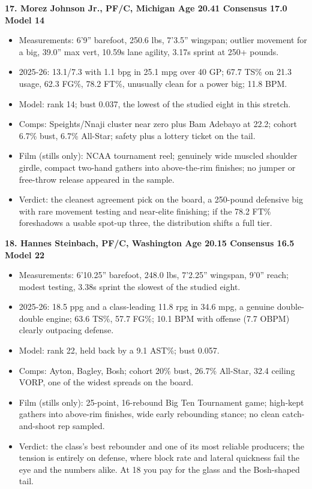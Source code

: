 \documentclass[
  10pt,
]{article}
\providecommand{\tightlist}{%
  \setlength{\itemsep}{0pt}\setlength{\parskip}{0pt}}
\begin{document}
\textbf{17. Morez Johnson Jr., PF/C, Michigan \textbar{} Age 20.41 \textbar{}
Consensus 17.0 \textbar{} Model 14}

\begin{itemize}
\tightlist
\item
  Measurements: 6'9'' barefoot, 250.6 lbs, 7'3.5'' wingspan; outlier movement
  for a big, 39.0'' max vert, 10.59s lane agility, 3.17s sprint at 250+ pounds.
\item
  2025-26: 13.1/7.3 with 1.1 bpg in 25.1 mpg over 40 GP; 67.7 TS\% on 21.3
  usage, 62.3 FG\%, 78.2 FT\%, unusually clean for a power big; 11.8 BPM.
\item
  Model: rank 14; bust 0.037, the lowest of the studied eight in this stretch.
\item
  Comps: Speights/Nnaji cluster near zero plus Bam Adebayo at 22.2; cohort 6.7\%
  bust, 6.7\% All-Star; safety plus a lottery ticket on the tail.
\item
  Film (stills only): NCAA tournament reel; genuinely wide muscled shoulder
  girdle, compact two-hand gathers into above-the-rim finishes; no jumper or
  free-throw release appeared in the sample.
\item
  Verdict: the cleanest agreement pick on the board, a 250-pound defensive big
  with rare movement testing and near-elite finishing; if the 78.2 FT\%
  foreshadows a usable spot-up three, the distribution shifts a full tier.
\end{itemize}

\textbf{18. Hannes Steinbach, PF/C, Washington \textbar{} Age 20.15 \textbar{}
Consensus 16.5 \textbar{} Model 22}

\begin{itemize}
\tightlist
\item
  Measurements: 6'10.25'' barefoot, 248.0 lbs, 7'2.25'' wingspan, 9'0'' reach;
  modest testing, 3.38s sprint the slowest of the studied eight.
\item
  2025-26: 18.5 ppg and a class-leading 11.8 rpg in 34.6 mpg, a genuine
  double-double engine; 63.6 TS\%, 57.7 FG\%; 10.1 BPM with offense (7.7 OBPM)
  clearly outpacing defense.
\item
  Model: rank 22, held back by a 9.1 AST\%; bust 0.057.
\item
  Comps: Ayton, Bagley, Bosh; cohort 20\% bust, 26.7\% All-Star, 32.4 ceiling
  VORP, one of the widest spreads on the board.
\item
  Film (stills only): 25-point, 16-rebound Big Ten Tournament game; high-kept
  gathers into above-rim finishes, wide early rebounding stance; no clean
  catch-and-shoot rep sampled.
\item
  Verdict: the class's best rebounder and one of its most reliable producers;
  the tension is entirely on defense, where block rate and lateral quickness
  fail the eye and the numbers alike. At 18 you pay for the glass and the
  Bosh-shaped tail.
\end{itemize}
\end{document}
